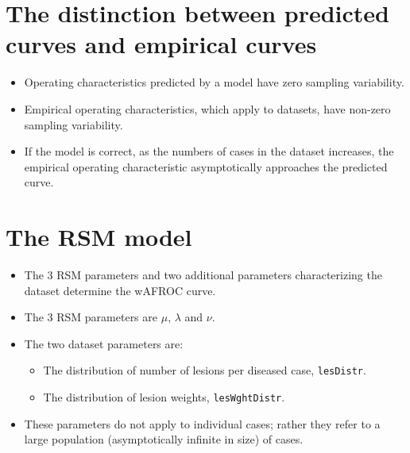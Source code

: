 \documentclass[
]{book}
\newenvironment{Shaded}{\begin{snugshade}}{\end{snugshade}}
\newcommand{\CommentTok}[1]{\textcolor[rgb]{0.56,0.35,0.01}{\textit{#1}}}
\newcommand{\KeywordTok}[1]{\textcolor[rgb]{0.13,0.29,0.53}{\textbf{#1}}}
\newcommand{\NormalTok}[1]{#1}
\newcommand{\OperatorTok}[1]{\textcolor[rgb]{0.81,0.36,0.00}{\textbf{#1}}}
\providecommand{\tightlist}{%
  \setlength{\itemsep}{0pt}\setlength{\parskip}{0pt}}
\begin{document}
\hypertarget{the-distinction-between-predicted-curves-and-empirical-curves}{%
\section{The distinction between predicted curves and empirical curves}\label{the-distinction-between-predicted-curves-and-empirical-curves}}

\begin{itemize}
\tightlist
\item
  Operating characteristics predicted by a model have zero sampling variability.\\
\item
  Empirical operating characteristics, which apply to datasets, have non-zero sampling variability.
\item
  If the model is correct, as the numbers of cases in the dataset increases, the empirical operating characteristic asymptotically approaches the predicted curve.
\end{itemize}

\hypertarget{the-rsm-model}{%
\section{The RSM model}\label{the-rsm-model}}

\begin{itemize}
\tightlist
\item
  The 3 RSM parameters and two additional parameters characterizing the dataset determine the wAFROC curve.
\item
  The 3 RSM parameters are \(\mu\), \(\lambda\) and \(\nu\).
\item
  The two dataset parameters are:

  \begin{itemize}
  \tightlist
  \item
    The distribution of number of lesions per diseased case, \texttt{lesDistr}.
  \item
    The distribution of lesion weights, \texttt{lesWghtDistr}.
  \end{itemize}
\item
  These parameters do not apply to individual cases; rather they refer to a large population (asymptotically infinite in size) of cases.
\end{itemize}

\begin{Shaded}
\end{Shaded}
\end{document}
